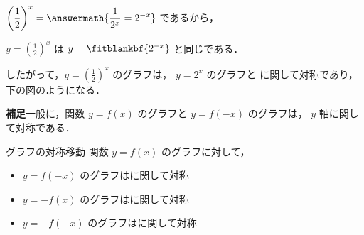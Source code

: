 \documentclass[14pt,dvipdfmx]{jsarticle}
\newcommand{\expaxes}[1]{%
  \foreach \gx in {-3.5,-3,...,3.5} \draw[gray!15] (\gx,-1.5) -- (\gx,#1.5);
  \foreach \gy in {-1.5,-1,...,#1.5} \draw[gray!15] (-3.5,\gy) -- (3.5,\gy);
  \foreach \gx in {-3,...,3} \draw[gray!65] (\gx,-1.5) -- (\gx,#1.5);
  \foreach \gy in {-1,...,#1} \draw[gray!65] (-3.5,\gy) -- (3.5,\gy);
  \draw[-{Stealth}] (-3.7,0) -- (3.8,0) node[right]{$x$};
  \draw[-{Stealth}] (0,-1.7) -- (0,#1.8) node[above]{$y$};
  \node[below left, inner sep=1pt, font=\scriptsize] at (0,0) {O};
  \foreach \i in {-3,-2,-1,1,2,3} \node[below, font=\scriptsize] at (\i,0) {$\i$};
  \foreach \j in {1,...,#1} \node[left, font=\scriptsize] at (0,\j) {$\j$};
}
\begin{document}
\par\vspace{0.5em}
\hspace*{1zw}$\displaystyle \left(\frac{1}{2}\right)^x = \answermath{\frac{1}{2^x} = 2^{-x}}$ であるから，\par
\hspace*{1zw}$\displaystyle y=\left(\frac{1}{2}\right)^x$ は $y=\fitblankbf{2^{-x}}$ と同じである．
\par\vspace{1em}
{%
  \setlength{\lineskiplimit}{6pt}\setlength{\lineskip}{8pt}%
  したがって，$y=\left(\frac{1}{2}\right)^x$ のグラフは，
  $y=2^x$ のグラフと に関して対称であり，下の図のようになる．\par
}

\begin{center}
\end{center}

\vfill
\textbf{補足}\quad 一般に，関数 $y=f(x)$ のグラフと $y=f(-x)$ のグラフは，
$y$ 軸に関して対称である．
\par\vspace{0.5em}
\begin{techniquebox}{グラフの対称移動}
  関数 $y=f(x)$ のグラフに対して，
  \begin{itemize}[leftmargin=1.5zw, itemsep=0.2em]
    \item $y=f(-x)$ のグラフはに関して対称
    \item $y=-f(x)$ のグラフはに関して対称
    \item $y=-f(-x)$ のグラフはに関して対称
  \end{itemize}
\end{techniquebox}

\nextpage
\end{document}
